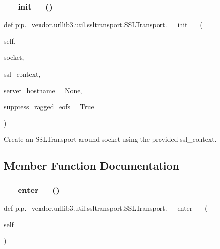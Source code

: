 \subsubsection{\texorpdfstring{\+\_\+\+\_\+init\+\_\+\+\_\+()}{\_\_init\_\_()}}
{\footnotesize\ttfamily def pip.\+\_\+vendor.\+urllib3.\+util.\+ssltransport.\+S\+S\+L\+Transport.\+\_\+\+\_\+init\+\_\+\+\_\+ (\begin{DoxyParamCaption}\item[{}]{self,  }\item[{}]{socket,  }\item[{}]{ssl\+\_\+context,  }\item[{}]{server\+\_\+hostname = {\ttfamily None},  }\item[{}]{suppress\+\_\+ragged\+\_\+eofs = {\ttfamily True} }\end{DoxyParamCaption})}

\begin{DoxyVerb}Create an SSLTransport around socket using the provided ssl_context.
\end{DoxyVerb}
 

\subsection{Member Function Documentation}
\mbox{\label{classpip_1_1__vendor_1_1urllib3_1_1util_1_1ssltransport_1_1SSLTransport_afdffe017ff935c815b7b602ab667c128}} 
\subsubsection{\texorpdfstring{\+\_\+\+\_\+enter\+\_\+\+\_\+()}{\_\_enter\_\_()}}
{\footnotesize\ttfamily def pip.\+\_\+vendor.\+urllib3.\+util.\+ssltransport.\+S\+S\+L\+Transport.\+\_\+\+\_\+enter\+\_\+\+\_\+ (\begin{DoxyParamCaption}\item[{}]{self }\end{DoxyParamCaption})}

